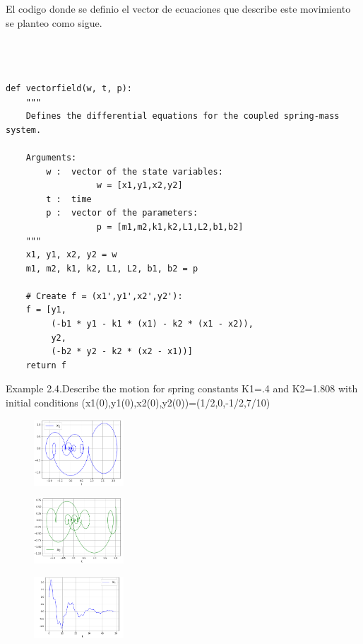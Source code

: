 \documentclass[a4paper]{article}
\begin{document}
El codigo donde se definio el vector de ecuaciones que describe este movimiento se planteo como sigue.

\begin{verbatim}



def vectorfield(w, t, p):
    """
    Defines the differential equations for the coupled spring-mass system.

    Arguments:
        w :  vector of the state variables:
                  w = [x1,y1,x2,y2]
        t :  time
        p :  vector of the parameters:
                  p = [m1,m2,k1,k2,L1,L2,b1,b2]
    """
    x1, y1, x2, y2 = w
    m1, m2, k1, k2, L1, L2, b1, b2 = p

    # Create f = (x1',y1',x2',y2'):
    f = [y1,
         (-b1 * y1 - k1 * (x1) - k2 * (x1 - x2)),
         y2,
         (-b2 * y2 - k2 * (x2 - x1))]
    return f

\end{verbatim}

Example 2.4.Describe the motion for spring constants K1=.4 and K2=1.808 with initial conditions (x1(0),y1(0),x2(0),y2(0))=(1/2,0,-1/2,7/10)  

\begin{figure}[ht!]
\centering
\includegraphics[width=0.3\textwidth]{2_4_1.png}
\end{figure}

\begin{figure}[ht!]
\centering
\includegraphics[width=0.3\textwidth]{2_4_2.png}
\end{figure}

\begin{figure}[ht!]
\centering
\includegraphics[width=0.3\textwidth]{2_4_3.png}
\end{figure}
\end{document}

